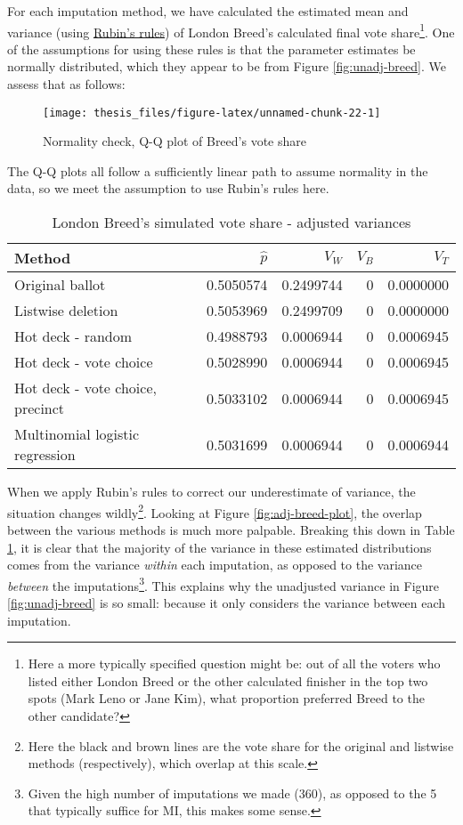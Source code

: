 \documentclass[12pt,twoside]{reedthesis}
\begin{document}
For each imputation method, we have calculated the estimated mean and variance (using \protect\hyperlink{rubins-rules}{Rubin's rules}) of London Breed's calculated final vote share\footnote{Here a more typically specified question might be: out of all the voters who listed either London Breed or the other calculated finisher in the top two spots (Mark Leno or Jane Kim), what proportion preferred Breed to the other candidate?}. One of the assumptions for using these rules is that the parameter estimates be normally distributed, which they appear to be from Figure \ref{fig:unadj-breed}. We assess that as follows:
\begin{figure}
\texttt{[image: thesis\_files/figure-latex/unnamed-chunk-22-1]} \caption{Normality check, Q-Q plot of Breed's vote share}\label{fig:unnamed-chunk-22}
\end{figure}
The Q-Q plots all follow a sufficiently linear path to assume normality in the data, so we meet the assumption to use Rubin's rules here.
\begin{table}[t]

\caption{\label{tab:adj-breed-tab}London Breed's simulated vote share - adjusted variances}
\centering
\begin{tabular}{lrrrr}
\toprule
Method & $\hat{p}$ & $V_W$ & $V_B$ & $V_T$\\
\midrule
Original ballot & 0.5050574 & 0.2499744 & 0 & 0.0000000\\
Listwise deletion & 0.5053969 & 0.2499709 & 0 & 0.0000000\\
Hot deck - random & 0.4988793 & 0.0006944 & 0 & 0.0006945\\
Hot deck - vote choice & 0.5028990 & 0.0006944 & 0 & 0.0006945\\
Hot deck - vote choice, precinct & 0.5033102 & 0.0006944 & 0 & 0.0006945\\
\addlinespace
Multinomial logistic regression & 0.5031699 & 0.0006944 & 0 & 0.0006944\\
\bottomrule
\end{tabular}
\end{table}
When we apply Rubin's rules to correct our underestimate of variance, the situation changes wildly\footnote{Here the black and brown lines are the vote share for the original and listwise methods (respectively), which overlap at this scale.}. Looking at Figure \ref{fig:adj-breed-plot}, the overlap between the various methods is much more palpable. Breaking this down in Table \ref{tab:adj-breed-tab}, it is clear that the majority of the variance in these estimated distributions comes from the variance \emph{within} each imputation, as opposed to the variance \emph{between} the imputations\footnote{Given the high number of imputations we made (360), as opposed to the 5 that typically suffice for MI, this makes some sense.}. This explains why the unadjusted variance in Figure \ref{fig:unadj-breed} is so small: because it only considers the variance between each imputation.
\end{document}
